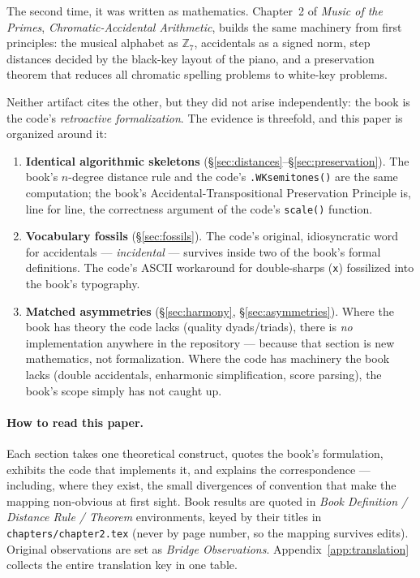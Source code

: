 \documentclass[11pt]{article}
\newcommand{\Zseven}{\mathbb{Z}_7}
\theoremstyle{definition}
\theoremstyle{remark}
\newcommand{\code}[1]{\texttt{#1}}
\newcommand{\file}[1]{\texttt{#1}}
\begin{document}
The second time, it was written as mathematics. Chapter~2 of \emph{Music of the
Primes}, \emph{Chromatic-Accidental Arithmetic}, builds the same machinery from
first principles: the musical alphabet as $\Zseven$, accidentals as a signed norm,
step distances decided by the black-key layout of the piano, and a preservation
theorem that reduces all chromatic spelling problems to white-key problems.

Neither artifact cites the other, but they did not arise independently: the book
is the code's \emph{retroactive formalization}. The evidence is threefold, and
this paper is organized around it:

\begin{enumerate}[leftmargin=2em]
  \item \textbf{Identical algorithmic skeletons} (\S\ref{sec:distances}--\S\ref{sec:preservation}).
        The book's $n$-degree distance rule and the code's
        \code{.WKsemitones()} are the same computation; the book's
        Accidental-Transpositional Preservation Principle is, line for line, the
        correctness argument of the code's \code{scale()} function.
  \item \textbf{Vocabulary fossils} (\S\ref{sec:fossils}). The code's original,
        idiosyncratic word for accidentals --- \emph{incidental} --- survives
        inside two of the book's formal definitions. The code's ASCII workaround
        for double-sharps (\code{x}) fossilized into the book's typography.
  \item \textbf{Matched asymmetries} (\S\ref{sec:harmony}, \S\ref{sec:asymmetries}).
        Where the book has theory the code lacks (quality dyads/triads), there is
        \emph{no} implementation anywhere in the repository --- because that
        section is new mathematics, not formalization. Where the code has
        machinery the book lacks (double accidentals, enharmonic simplification,
        score parsing), the book's scope simply has not caught up.
\end{enumerate}

\paragraph{How to read this paper.} Each section takes one theoretical construct,
quotes the book's formulation, exhibits the code that implements it, and explains
the correspondence --- including, where they exist, the small divergences of
convention that make the mapping non-obvious at first sight. Book results are
quoted in \emph{Book Definition / Distance Rule / Theorem} environments, keyed by
their titles in \file{chapters/chapter2.tex} (never by page number, so the mapping
survives edits). Original observations are set as \emph{Bridge Observations}.
Appendix~\ref{app:translation} collects the entire translation key in one table.
\end{document}

